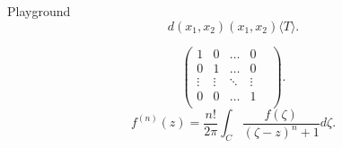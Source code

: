 \documentclass[class=article, crop=false]{standalone}
\begin{document}
\begin{zettel}{Playground}
\[
    d(x_1,x_2) (x_1,x_2) \langle T\rangle 
.\]

\[
    \begin{pmatrix}
    1       & 0       &  \dots  & 0 \\
    0       & 1       &  \dots  & 0 \\
     \vdots &  \vdots &  \ddots &  \vdots &  \\
    0       & 0       &  \dots  & 1 \\
    \end{pmatrix}
.\]
\[
f ^{(n)}(z) =  \frac{n!}{2 \pi } \int_{C}^{} \frac{f (\zeta)}{(\zeta-z)^n+1 } d \zeta
.\]

\end{zettel}
\end{document}
